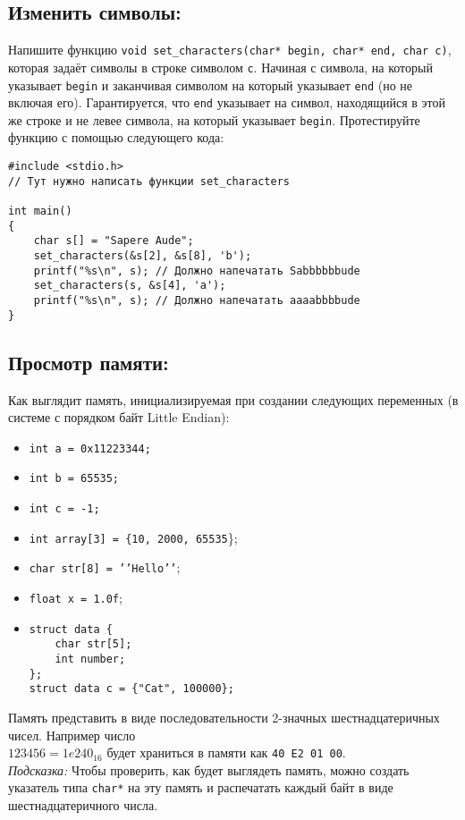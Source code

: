 \documentclass{article}
\begin{document}
\subsection{Изменить символы:}
Напишите функцию \texttt{void set\_characters(char* begin, char* end, char c)}, которая задаёт символы в строке символом \texttt{c}. Начиная с символа, на который указывает \texttt{begin} и заканчивая символом на который указывает \texttt{end} (но не включая его). Гарантируется, что \texttt{end} указывает на символ, находящийся в этой же строке и не левее символа, на который указывает \texttt{begin}. Протестируйте функцию с помощью следующего кода:
\begin{lstlisting}
#include <stdio.h>
// Тут нужно написать функции set_characters

int main() 
{
    char s[] = "Sapere Aude";
    set_characters(&s[2], &s[8], 'b');
    printf("%s\n", s); // Должно напечатать Sabbbbbbude
    set_characters(s, &s[4], 'a');
    printf("%s\n", s); // Должно напечатать aaaabbbbude
}
\end{lstlisting}


\subsection{Просмотр памяти:}
Как выглядит память, инициализируемая при создании следующих переменных (в системе с порядком байт Little Endian):
\begin{multicols}{2}
\begin{itemize}
\item \texttt{int a = 0x11223344;}
\item \texttt{int b = 65535;}
\item \texttt{int c = -1;}
\item \texttt{int array[3] = \{10, 2000, 65535}\};
\item \texttt{char str[8] = '{}'Hello'{}'};
\item \texttt{float x = 1.0f};
\item
\begin{verbatim}
struct data {
    char str[5];
    int number;
};
struct data c = {"Cat", 100000};
\end{verbatim}
\end{itemize}
\end{multicols}
Память представить в виде последовательности 2-значных шестнадцатеричных чисел. Например число \\
$123456 = 1e240_{16}$ будет храниться в памяти как \texttt{40 E2 01 00}. \\

\textit{Подсказка:} Чтобы проверить, как будет выглядеть память, можно создать указатель типа \texttt{char*} на эту память и распечатать каждый байт в виде шестнадцатеричного числа.
\end{document}
